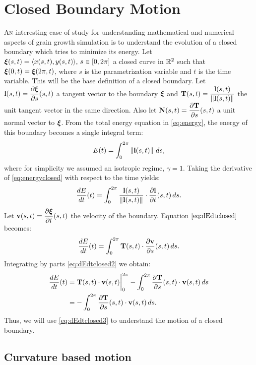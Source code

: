 \chapter{Closed Boundary Motion}
\label{chap:closedboundary}

\lettrine{A}{n} interesting case of study for understanding mathematical and numerical aspects of grain growth simulation is to understand the evolution of a closed boundary which tries to minimize its energy. 
Let $\bm{\xi}(s,t) = \langle x(s,t), y(s,t)\rangle,\, s \in [0, 2\pi]$ a closed curve in $\mathbb{R}^2$ such that $\bm{\xi}(0,t) = \bm{\xi}(2\pi,t)$, where $s$ is the parametrization variable and $t$ is the time variable. 
This will be the base definition of a closed boundary. 
Let $\mathbf{l}(s,t) = \dfrac{\partial \bm{\xi}}{\partial s}(s,t)$ a tangent vector to the boundary $\bm{\xi}$ and $\mathbf{T}(s,t) = \dfrac{\mathbf{l}(s,t)}{\left\lVert\mathbf{l}(s,t)\right\rVert}$ the unit tangent vector in the same direction. 
Also let $\mathbf{N}(s,t) = \dfrac{\partial \mathbf{T}}{\partial s}(s,t)$ a unit normal vector to $\bm{\xi}$. 
From the total energy equation in \eqref{eq:energy}, the energy of this boundary becomes a single integral term:
\begin{equation}
    E(t) = \int_0^{2\pi} \left\lVert\mathbf{l}(s,t)\right\rVert\, ds,
    \label{eq:energyclosed}
\end{equation}
where for simplicity we assumed an isotropic regime, \ie $\gamma = 1$. 
Taking the derivative of \eqref{eq:energyclosed} with respect to the time yields:
\begin{equation}
    \dfrac{dE}{dt}(t) = \int_0^{2\pi} \dfrac{\mathbf{l}(s,t)}{\left\lVert\mathbf{l}(s,t)\right\rVert} \cdot \dfrac{\partial \mathbf{l}}{\partial t}(s,t) \, ds.
    \label{eq:dEdtclosed}
\end{equation}
Let $\mathbf{v}(s,t) = \dfrac{\partial \bm{\xi}}{\partial t}(s,t)$ the velocity of the boundary. Equation $\eqref{eq:dEdtclosed}$ becomes:
\begin{equation}
    \dfrac{dE}{dt}(t) = \int_0^{2\pi} \mathbf{T}(s,t) \cdot \dfrac{\partial \mathbf{v}}{\partial s}(s,t) \, ds.
    \label{eq:dEdtclosed2}
\end{equation}
Integrating by parts \eqref{eq:dEdtclosed2} we obtain:
\begin{align}
    \dfrac{dE}{dt}(t) &= \mathbf{T}(s,t)\cdot\mathbf{v}(s,t)\bigg\rvert_{0}^{2\pi} - \int_0^{2\pi}  \dfrac{\partial \mathbf{T}}{\partial s}(s,t) \cdot \mathbf{v}(s,t) \, ds \nonumber\\
    &= -\int_0^{2\pi} \dfrac{\partial \mathbf{T}}{\partial s}(s,t) \cdot \mathbf{v}(s,t)\, ds. \label{eq:dEdtclosed3}
\end{align}
Thus, we will use \eqref{eq:dEdtclosed3} to understand the motion of a closed boundary.

\section{Curvature based motion}

